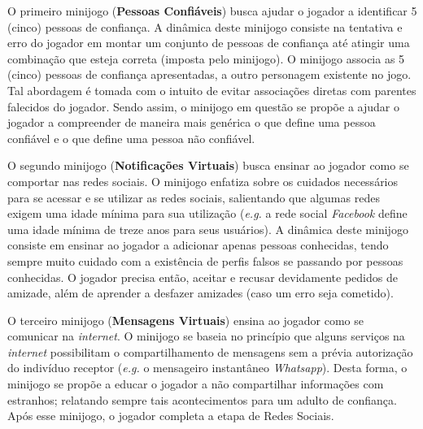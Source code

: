 O primeiro minijogo (\textbf{Pessoas Confiáveis}) busca ajudar o jogador a identificar 5 (cinco) pessoas de confiança. A dinâmica deste minijogo consiste na tentativa e erro do jogador em montar um conjunto de pessoas de confiança até atingir uma combinação que esteja correta (imposta pelo minijogo). O minijogo associa as 5 (cinco) pessoas de confiança apresentadas, a outro personagem existente no jogo. Tal abordagem é tomada com o intuito de evitar associações diretas com parentes falecidos do jogador. Sendo assim, o minijogo em questão se propõe a ajudar o jogador a compreender de maneira mais genérica o que define uma pessoa confiável e o que define uma pessoa não confiável. 


O segundo minijogo (\textbf{Notificações Virtuais}) busca ensinar ao jogador como se comportar nas redes sociais. O minijogo enfatiza sobre os cuidados necessários para se acessar e se utilizar as redes sociais, salientando que algumas redes exigem uma idade mínima para sua utilização (\textit{e.g.} a rede social \textit{Facebook} define uma idade mínima de treze anos para seus usuários). A dinâmica deste minijogo consiste em ensinar ao jogador a adicionar apenas pessoas conhecidas, tendo sempre muito cuidado com a existência de perfis falsos se passando por pessoas conhecidas. O jogador precisa então, aceitar e recusar devidamente pedidos de amizade, além de aprender a desfazer amizades (caso um erro seja cometido). 

O terceiro minijogo (\textbf{Mensagens Virtuais}) ensina ao jogador como se comunicar na \textit{internet}. O minijogo se baseia no princípio que alguns serviços na \textit{internet} possibilitam o compartilhamento de mensagens sem a prévia autorização do indivíduo receptor (\textit{e.g.} o mensageiro instantâneo \textit{Whatsapp}). Desta forma, o minijogo se propõe a educar o jogador a não compartilhar informações com estranhos; relatando sempre tais acontecimentos para um adulto de confiança. Após esse minijogo, o jogador completa a etapa de Redes Sociais. 

